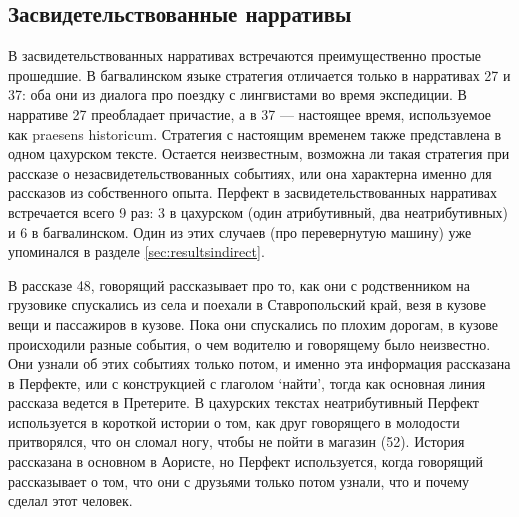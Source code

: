 \subsection{Засвидетельствованные нарративы} \label{sec:resultsdirect}

В засвидетельствованных нарративах встречаются преимущественно простые прошедшие. В багвалинском языке стратегия отличается только в нарративах 27 и 37: оба они из диалога про поездку с лингвистами во время экспедиции. В нарративе 27 преобладает причастие, а в 37 --- настоящее время, используемое как praesens historicum. Стратегия с настоящим временем также представлена в одном цахурском тексте. Остается неизвестным, возможна ли такая стратегия при рассказе о незасвидетельствованных событиях, или она характерна именно для рассказов из собственного опыта. Перфект в засвидетельствованных нарративах встречается всего 9 раз: 3 в цахурском (один атрибутивный, два неатрибутивных) и 6 в багвалинском. Один из этих случаев (про перевернутую машину) уже упоминался в разделе \ref{sec:resultsindirect}. 
\par В рассказе 48, говорящий рассказывает про то, как они с родственником на грузовике спускались из села и поехали в Ставропольский край, везя в кузове вещи и пассажиров в кузове. Пока они спускались по плохим дорогам, в кузове происходили разные события, о чем водителю и говорящему было неизвестно. Они узнали об этих событиях только потом, и именно эта информация рассказана в Перфекте, или с конструкцией с глаголом ‘найти’, тогда как основная линия рассказа ведется в Претерите. В цахурских текстах неатрибутивный Перфект используется в короткой истории о том, как друг говорящего в молодости притворялся, что он сломал ногу, чтобы не пойти в магазин (52). История рассказана в основном в Аористе, но Перфект используется, когда говорящий рассказывает о том, что они с друзьями только потом узнали, что и почему сделал этот человек.

\vfill
\pagebreak


